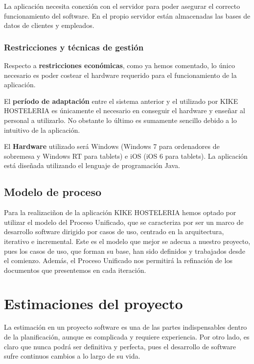 \documentclass[spanish,a4paper,11pt, twoside]{report}	%
\begin{document}
La aplicación necesita conexión con el servidor para poder asegurar el correcto funcionamiento del software. En el propio servidor están almacenadas las bases de datos de clientes y empleados.


		\subsection{Restricciones y técnicas de gestión}
Respecto a \textbf{restricciones económicas}, como ya hemos comentado, lo único necesario es poder costear el hardware requerido para el funcionamiento de la aplicación.

El \textbf{período de adaptación} entre el sistema anterior y el utilizado por KIKE HOSTELERIA es únicamente el necesario en conseguir el hardware y enseñar al personal a utilizarlo. No obstante lo último es sumamente sencillo debido a lo intuitivo de la aplicación.

El \textbf{Hardware} utilizado será Windows (Windows 7 para ordenadores de sobremesa y Windows RT para tablets) e iOS (iOS 6 para tablets). La aplicación está diseñada utilizando el lenguaje de programación Java.

	\section{Modelo de proceso} Para la realizaciñon de la aplicación KIKE HOSTELERIA hemos optado por utilizar el modelo del Proceso Unificado, que se caracteriza por ser un marco de desarrollo software dirigido por casos de uso, centrado en la arquitectura, iterativo e incremental. Este es el modelo que mejor se adecua a nuestro proyecto, pues los casos de uso, que forman su base, han sido definidos y trabajados desde el comienzo. Además, el Proceso Unificado nos permitirá la refinación de los documentos que presentemos en cada iteración.

\newpage
\mbox{}
\thispagestyle{empty}						%
\newpage
\setcounter{section}{0}

\chapter{Estimaciones del proyecto}

		La estimación en un proyecto software es una de las partes indispensables dentro
		de la planificación, aunque es complicada y requiere experiencia. Por otro lado,
		es claro que nunca podrá ser definitiva y perfecta, pues el desarrollo de
		software sufre continuos cambios a lo largo de su vida.
		
\end{document}
